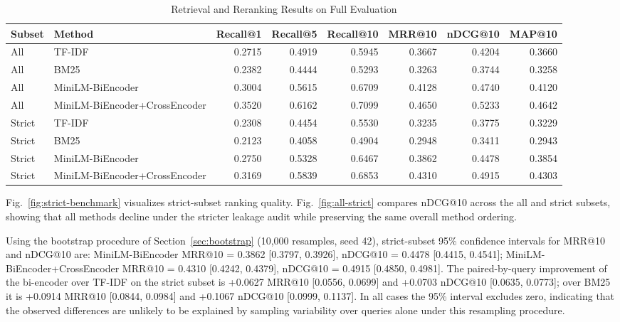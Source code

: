 \documentclass[conference]{IEEEtran}
\begin{document}
\begin{table}[htbp]
\caption{Retrieval and Reranking Results on Full Evaluation}
\label{tab:metrics}
\centering
\scriptsize
\begin{tabular}{llrrrrrr}
\toprule
\textbf{Subset} & \textbf{Method} & \textbf{Recall@1} & \textbf{Recall@5} & \textbf{Recall@10} & \textbf{MRR@10} & \textbf{nDCG@10} & \textbf{MAP@10} \\
\midrule
All & TF-IDF & 0.2715 & 0.4919 & 0.5945 & 0.3667 & 0.4204 & 0.3660 \\
All & BM25 & 0.2382 & 0.4444 & 0.5293 & 0.3263 & 0.3744 & 0.3258 \\
All & MiniLM-BiEncoder & 0.3004 & 0.5615 & 0.6709 & 0.4128 & 0.4740 & 0.4120 \\
All & MiniLM-BiEncoder+CrossEncoder & 0.3520 & 0.6162 & 0.7099 & 0.4650 & 0.5233 & 0.4642 \\
\midrule
Strict & TF-IDF & 0.2308 & 0.4454 & 0.5530 & 0.3235 & 0.3775 & 0.3229 \\
Strict & BM25 & 0.2123 & 0.4058 & 0.4904 & 0.2948 & 0.3411 & 0.2943 \\
Strict & MiniLM-BiEncoder & 0.2750 & 0.5328 & 0.6467 & 0.3862 & 0.4478 & 0.3854 \\
Strict & MiniLM-BiEncoder+CrossEncoder & 0.3169 & 0.5839 & 0.6853 & 0.4310 & 0.4915 & 0.4303 \\
\bottomrule
\end{tabular}
\end{table}

Fig.~\ref{fig:strict-benchmark} visualizes strict-subset ranking quality. Fig.~\ref{fig:all-strict} compares nDCG@10 across the all and strict subsets, showing that all methods decline under the stricter leakage audit while preserving the same overall method ordering.

Using the bootstrap procedure of Section~\ref{sec:bootstrap} (10,000 resamples, seed 42), strict-subset 95\% confidence intervals for MRR@10 and nDCG@10 are: MiniLM-BiEncoder MRR@10 = 0.3862 [0.3797, 0.3926], nDCG@10 = 0.4478 [0.4415, 0.4541]; MiniLM-BiEncoder+CrossEncoder MRR@10 = 0.4310 [0.4242, 0.4379], nDCG@10 = 0.4915 [0.4850, 0.4981]. The paired-by-query improvement of the bi-encoder over TF-IDF on the strict subset is +0.0627 MRR@10 [0.0556, 0.0699] and +0.0703 nDCG@10 [0.0635, 0.0773]; over BM25 it is +0.0914 MRR@10 [0.0844, 0.0984] and +0.1067 nDCG@10 [0.0999, 0.1137]. In all cases the 95\% interval excludes zero, indicating that the observed differences are unlikely to be explained by sampling variability over queries alone under this resampling procedure.
\end{document}
